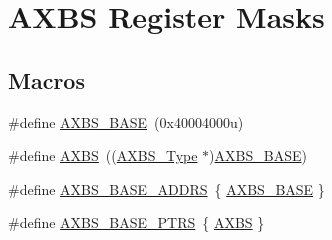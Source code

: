 \hypertarget{group___a_x_b_s___register___masks}{}\section{A\+X\+BS Register Masks}
\label{group___a_x_b_s___register___masks}
\subsection*{Macros}
\begin{DoxyCompactItemize}
\item 
\#define \mbox{\hyperlink{group___a_x_b_s___register___masks_ga99fb6b20345e6deac58c537b7c30680b}{A\+X\+B\+S\+\_\+\+B\+A\+SE}}~(0x40004000u)
\item 
\#define \mbox{\hyperlink{group___a_x_b_s___register___masks_gaa1f873165d665725d94cd2615e37daf5}{A\+X\+BS}}~((\mbox{\hyperlink{struct_a_x_b_s___type}{A\+X\+B\+S\+\_\+\+Type}} $\ast$)\mbox{\hyperlink{group___a_x_b_s___register___masks_ga99fb6b20345e6deac58c537b7c30680b}{A\+X\+B\+S\+\_\+\+B\+A\+SE}})
\item 
\#define \mbox{\hyperlink{group___a_x_b_s___register___masks_ga401a7e5a8976f1312fd3dcf0ffd7f45e}{A\+X\+B\+S\+\_\+\+B\+A\+S\+E\+\_\+\+A\+D\+D\+RS}}~\{ \mbox{\hyperlink{group___a_x_b_s___register___masks_ga99fb6b20345e6deac58c537b7c30680b}{A\+X\+B\+S\+\_\+\+B\+A\+SE}} \}
\item 
\#define \mbox{\hyperlink{group___a_x_b_s___register___masks_ga522ab97d5ed3e73f1cb3591c40ecc50e}{A\+X\+B\+S\+\_\+\+B\+A\+S\+E\+\_\+\+P\+T\+RS}}~\{ \mbox{\hyperlink{group___a_x_b_s___register___masks_gaa1f873165d665725d94cd2615e37daf5}{A\+X\+BS}} \}
\end{DoxyCompactItemize}
